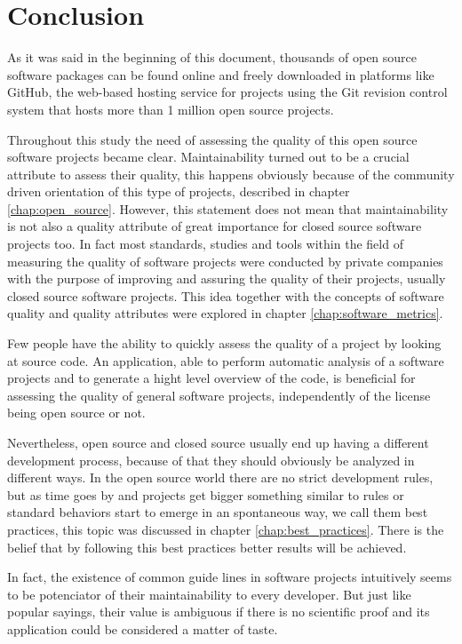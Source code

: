 \thispagestyle{empty}
\chapter{Conclusion}\label{chap:conclusion}


As it was said in the beginning of this document, thousands of open source software packages can be found online and 
freely downloaded in platforms like GitHub,
the web-based hosting service for projects using the Git revision control system that 
hosts more than 1 million open source projects.

Throughout this study the need of assessing the quality of this open source software projects became clear.
Maintainability turned out to be a crucial attribute to assess their quality, 
this happens obviously because of the community driven orientation of this type of projects, 
described in chapter \ref{chap:open_source}. 
However, this statement does not mean that maintainability is not also a quality attribute of great importance
for closed source software projects too. 
In fact most standards, studies and tools within the field of measuring the quality of software projects 
were conducted by private companies with the purpose of improving and assuring the quality of their projects,
usually closed source software projects. This idea together with the concepts of software quality and 
quality attributes were explored in chapter \ref{chap:software_metrics}.

Few people have the ability to quickly assess the quality of a project by looking at source code. 
An application, able to perform automatic analysis of a software projects and to generate a hight level overview of the code,
is beneficial for assessing the quality of general software projects, independently of the license being open source or not.

Nevertheless, open source and closed source usually end up having a different development process, 
because of that they should obviously be analyzed in different ways.
In the open source world there are no strict development rules, 
but as time goes by and projects get bigger something similar to rules
or standard behaviors start to emerge in an spontaneous way, we call them best practices,
this topic was discussed in chapter \ref{chap:best_practices}.
There is the belief that by following this best practices better results will be achieved.

In fact, the existence of common guide lines in software projects intuitively seems to be potenciator of their 
maintainability to every developer.
But just like popular sayings, their value is ambiguous if there is no scientific proof and 
its application could be considered a matter of taste.

